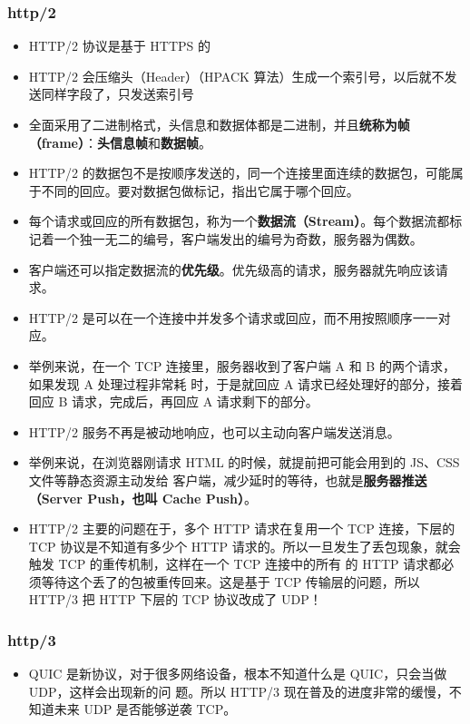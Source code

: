 \subsubsection{http/2}
\begin{itemize}
\item HTTP/2 协议是基于 HTTPS 的
\item HTTP/2 会压缩头（Header）（HPACK 算法）生成一个索引号，以后就不发送同样字段了，只发送索引号
\item 全面采用了二进制格式，头信息和数据体都是二进制，并且\textbf{统称为帧（frame）}：\textbf{头信息帧}和\textbf{数据帧}。
\item HTTP/2 的数据包不是按顺序发送的，同一个连接里面连续的数据包，可能属于不同的回应。要对数据包做标记，指出它属于哪个回应。
\item 每个请求或回应的所有数据包，称为一个\textbf{数据流（Stream）}。每个数据流都标记着一个独一无二的编号，客户端发出的编号为奇数，服务器为偶数。
\item 客户端还可以指定数据流的\textbf{优先级}。优先级高的请求，服务器就先响应该请求。
\item HTTP/2 是可以在一个连接中并发多个请求或回应，而不用按照顺序一一对应。
\item 举例来说，在一个 TCP 连接里，服务器收到了客户端 A 和 B 的两个请求，如果发现 A 处理过程非常耗 时，于是就回应 A 请求已经处理好的部分，接着回应 B 请求，完成后，再回应 A 请求剩下的部分。
\item HTTP/2 服务不再是被动地响应，也可以主动向客户端发送消息。
\item 举例来说，在浏览器刚请求 HTML 的时候，就提前把可能会用到的 JS、CSS 文件等静态资源主动发给 客户端，减少延时的等待，也就是\textbf{服务器推送（Server Push，也叫 Cache Push）}。
\item HTTP/2 主要的问题在于，多个 HTTP 请求在复用一个 TCP 连接，下层的 TCP 协议是不知道有多少个 HTTP 请求的。所以一旦发生了丢包现象，就会触发 TCP 的重传机制，这样在一个 TCP 连接中的所有 的 HTTP 请求都必须等待这个丢了的包被重传回来。这是基于 TCP 传输层的问题，所以  HTTP/3 把 HTTP 下层的 TCP 协议改成了 UDP！
\end{itemize}

\subsubsection{http/3}
\begin{itemize}
\item QUIC 是新协议，对于很多网络设备，根本不知道什么是 QUIC，只会当做 UDP，这样会出现新的问 题。所以 HTTP/3 现在普及的进度非常的缓慢，不知道未来 UDP 是否能够逆袭 TCP。
\end{itemize}


